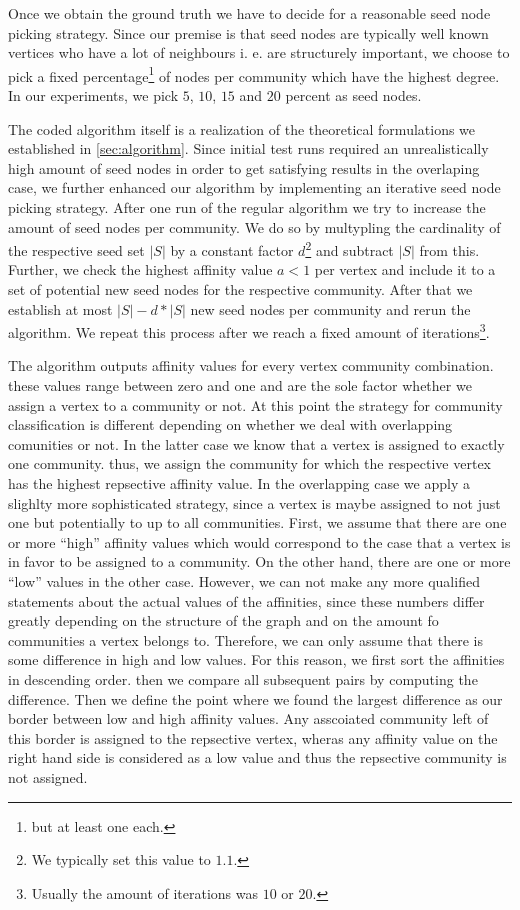 Once we obtain the ground truth we have to decide for a reasonable seed node 
picking strategy. Since our premise is that seed nodes are typically well known vertices who have a lot of neighbours i. e. are structurely important, we choose to pick a fixed percentage\footnote{but at least one each.} of nodes per community which have the highest degree. In our experiments, we pick $5$, $10$, $15$ and $20$ percent as seed nodes.

The coded algorithm itself is a realization of the theoretical formulations we 
established in \ref{sec:algorithm}. Since initial test runs required an unrealistically high amount of seed nodes in order to get satisfying results in the overlaping case, we further enhanced our algorithm by implementing an iterative seed node picking strategy. After one run of the regular algorithm we try to increase the amount of seed nodes per community. We do so by multypling the cardinality of the respective seed set $\left| S \right|$ by a constant factor $d$\footnote{We typically set this value to $1.1$.} and subtract $\left| S \right|$ from this. Further, we check the highest affinity value $a < 1$ per vertex and include it to a set of potential new seed nodes for the respective community. After that we establish at most 
$\left| S \right| - d * \left| S \right|$ new seed nodes per community and rerun the algorithm. We repeat this process after we reach a fixed amount of 
iterations\footnote{Usually the amount of iterations was $10$ or $20$.}.

The algorithm outputs affinity values for every vertex community combination. 
these values range between zero and one and are the sole factor whether we 
assign a vertex to a community or not. At this point the strategy for community classification is different depending on whether we deal with overlapping comunities or not. In the latter case we know that a vertex is assigned to exactly one community. thus, we assign the community for which the respective vertex has the highest repsective affinity value. In the overlapping case we apply a slighlty more sophisticated strategy, since a vertex is maybe assigned to not just one but potentially to up to all communities. First, we assume that there are one or more ``high'' affinity values which would correspond to the 
case that a vertex is in favor to be assigned to a community. On the other hand, there are one or more ``low'' values in the other case. However, we can not make any more qualified statements about the actual values of the affinities, since these numbers differ greatly depending on the structure of the graph and on the amount fo communities a vertex belongs to. Therefore, we can only assume that there is some difference in high and low values. For this reason, we first sort the affinities in descending order. then we compare all subsequent pairs by computing the difference. Then we define the point where we found the largest difference as our border between low and high affinity values. Any asscoiated community left of this border is assigned to the repsective vertex, wheras any affinity value on the right hand side is considered as a low value and thus the repsective community is not assigned.

